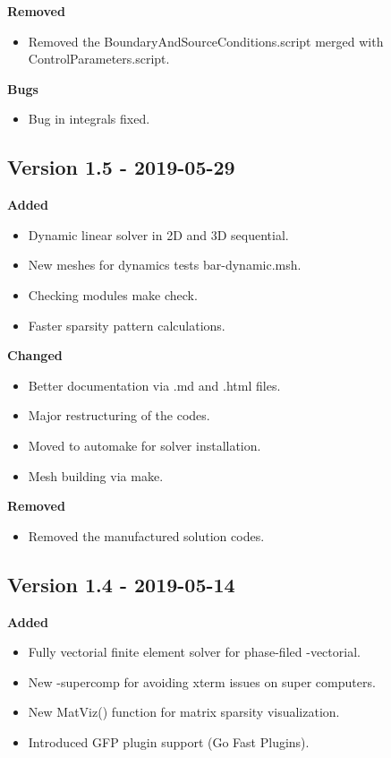 \textbf{Removed}
\begin{itemize}
 \item Removed the {\ttfamily BoundaryAndSourceConditions.script} merged with {\ttfamily ControlParameters.script}.
\end{itemize}

\textbf{Bugs}
\begin{itemize}
 \item Bug in integrals fixed.
\end{itemize}


\subsection{Version 1.5 - 2019-05-29}

\textbf{Added}
\begin{itemize}
 \item Dynamic linear solver in 2D and 3D  sequential.
 \item New meshes for dynamics tests {\ttfamily bar-dynamic.msh}.
 \item Checking modules {\ttfamily make check}.
 \item Faster sparsity pattern calculations. 
\end{itemize}

\textbf{Changed}
\begin{itemize}
 \item Better documentation via {\ttfamily.md} and {\ttfamily.html} files.
 \item Major restructuring of the codes. 
 \item Moved to {\ttfamily automake} for solver installation.
 \item Mesh building via {\ttfamily make}.
\end{itemize}

\textbf{Removed}
\begin{itemize}
 \item Removed the manufactured solution codes.
\end{itemize}

\subsection{Version 1.4 - 2019-05-14}

\textbf{Added}
\begin{itemize}
 \item Fully vectorial finite element solver for phase-filed {\ttfamily-vectorial}.
 \item New {\ttfamily-supercomp} for avoiding xterm issues on super computers.
 \item New {\ttfamily MatViz()} function for matrix sparsity visualization.
 \item Introduced  {\ttfamily GFP} plugin support (Go Fast Plugins). 
\end{itemize}

